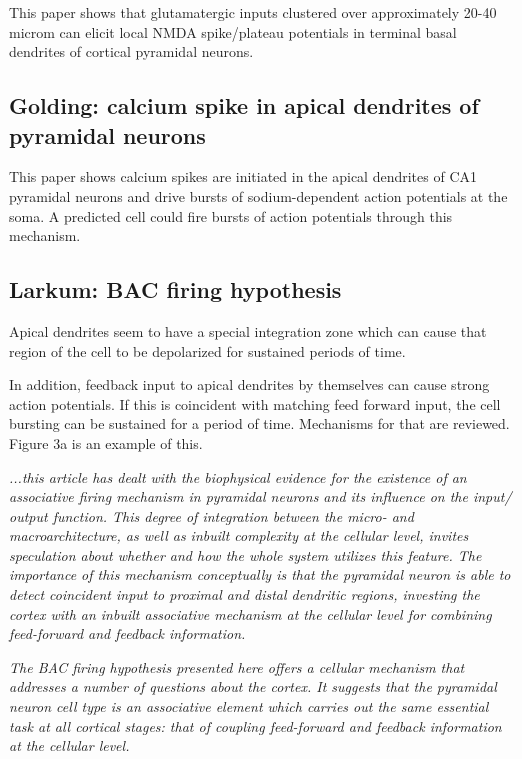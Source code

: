 \documentclass{article} %
\begin{document}
This paper \cite{Major2008} shows that glutamatergic inputs clustered over 
approximately 20-40 microm can elicit local NMDA spike/plateau potentials in 
terminal basal dendrites of cortical pyramidal neurons.

\subsection{Golding: calcium spike in apical dendrites of pyramidal neurons}

This paper \cite{Golding1999} shows calcium spikes are initiated in the apical 
dendrites of CA1 pyramidal neurons and drive bursts of sodium-dependent action 
potentials at the soma. A predicted cell could fire bursts of action potentials 
through this mechanism. 

\subsection{Larkum: BAC firing hypothesis}

Apical dendrites seem to have a special integration zone which can cause that
region of the cell to be depolarized for sustained periods of time.

In addition, feedback input to apical dendrites by themselves can cause strong
action potentials.   If this is coincident with matching feed forward input, the
cell bursting can be sustained for a period of time. Mechanisms for that are
reviewed. Figure 3a is an example of this.

\emph{
...this article \cite{Larkum2013} has dealt with the biophysical
evidence for the existence of an associative firing mechanism in pyramidal
neurons and its influence on the input/ output function. This degree of
integration between the micro- and macroarchitecture, as well as inbuilt
complexity at the cellular level, invites speculation about whether and how the
whole system utilizes this feature. The importance of this mechanism
conceptually is that the pyramidal neuron is able to detect coincident input to
proximal and distal dendritic regions, investing the cortex with an inbuilt
associative mechanism at the cellular level for combining feed-forward and
feedback information.}

\emph{The BAC firing hypothesis presented here offers a cellular mechanism that
addresses a number of questions about the cortex. It suggests that the
pyramidal neuron cell type is an associative element which carries out the same
essential task at all cortical stages: that of coupling feed-forward and
feedback information at the cellular level.}
\end{document}
